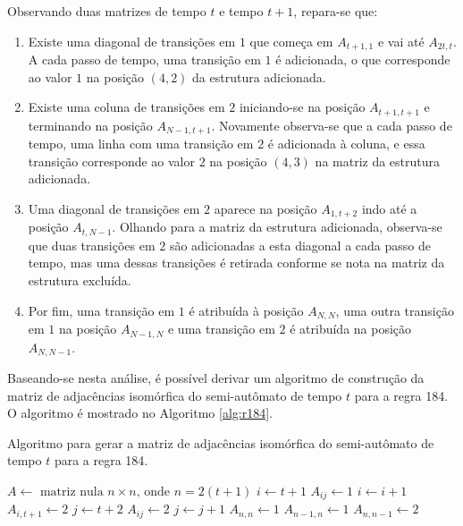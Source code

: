 \documentclass[12pt,a4paper]{article}
\begin{document}
Observando duas matrizes de tempo $t$ e tempo $t+1$, repara-se que:

\begin{enumerate}
\item Existe uma diagonal de transições em $1$ que começa em $A_{t+1,1}$
e vai até $A_{2t,t}$. A cada passo de tempo, uma transição em $1$ é adicionada,
o que corresponde ao valor $1$ na posição $(4,2)$ da estrutura adicionada.

\item Existe uma coluna de transições em $2$ iniciando-se na posição
$A_{t+1,t+1}$ e terminando na posição $A_{N-1,t+1}$. Novamente observa-se
que a cada passo de tempo, uma linha com uma transição em $2$ é adicionada à
coluna, e essa transição corresponde ao valor $2$ na posição $(4,3)$ na matriz da
estrutura adicionada.

\item Uma diagonal de transições em $2$ aparece na posição $A_{1,t+2}$ indo
até a posição $A_{t,N-1}$. Olhando para a matriz da estrutura adicionada,
observa-se que duas transições em $2$ são adicionadas a esta diagonal a cada
passo de tempo, mas uma dessas transições é retirada conforme se nota na
matriz da estrutura excluída.

\item Por fim, uma transição em $1$ é atribuída à posição $A_{N,N}$, uma
outra transição em $1$ na posição $A_{N-1,N}$ e uma transição em $2$ é
atribuída na posição $A_{N,N-1}$.
\end{enumerate}

Baseando-se nesta análise, é possível derivar um algoritmo de construção da
matriz de adjacências isomórfica do semi-autômato de tempo $t$ para a
regra 184. O algoritmo é mostrado no Algoritmo \ref{alg:r184}.

\begin{algorithm}
\caption{Algoritmo para gerar a matriz de adjacências isomórfica do
semi-autômato de tempo $t$ para a regra 184.}
\label{alg:r184}
\begin{algorithmic}
\STATE $A \leftarrow \mbox{ matriz nula } n \times n \mbox{, onde } n=2(t+1)$
\STATE $i \leftarrow t+1$
\STATE $A_{ij} \leftarrow 1$
\STATE $i \leftarrow i+1$
\ENDFOR
{}
\STATE $A_{i,t+1} \leftarrow 2$
\ENDFOR
\STATE $j \leftarrow t+2$
\STATE $A_{ij} \leftarrow 2$
\STATE $j \leftarrow j+1$
\ENDFOR
\STATE $A_{n,n} \leftarrow 1$
\STATE $A_{n-1,n} \leftarrow 1$
\STATE $A_{n,n-1} \leftarrow 2$
\end{algorithmic}
\end{algorithm}
\end{document}
